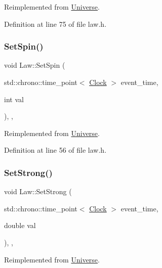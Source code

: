 Reimplemented from \hyperlink{class_universe_ae0cb8d86b2fbb8396d605160344b42f5}{Universe}.



Definition at line 75 of file law.\+h.

\mbox{\label{class_law_a3de75edea5e20db0a7b731de61f07dea}} 
\subsubsection{\texorpdfstring{Set\+Spin()}{SetSpin()}}
{\footnotesize\ttfamily void Law\+::\+Set\+Spin (\begin{DoxyParamCaption}\item[{std\+::chrono\+::time\+\_\+point$<$ \hyperlink{universe_8h_a0ef8d951d1ca5ab3cfaf7ab4c7a6fd80}{Clock} $>$}]{event\+\_\+time,  }\item[{int}]{val }\end{DoxyParamCaption})\hspace{0.3cm}{\ttfamily [inline]}, {\ttfamily [final]}, {\ttfamily [virtual]}}



Reimplemented from \hyperlink{class_universe_ae2ae1c3b3e4cde2c18f5f6a814761ec8}{Universe}.



Definition at line 56 of file law.\+h.

\mbox{\label{class_law_a4cd0dd1908edbd02090dd1ba1387d722}} 
\subsubsection{\texorpdfstring{Set\+Strong()}{SetStrong()}}
{\footnotesize\ttfamily void Law\+::\+Set\+Strong (\begin{DoxyParamCaption}\item[{std\+::chrono\+::time\+\_\+point$<$ \hyperlink{universe_8h_a0ef8d951d1ca5ab3cfaf7ab4c7a6fd80}{Clock} $>$}]{event\+\_\+time,  }\item[{double}]{val }\end{DoxyParamCaption})\hspace{0.3cm}{\ttfamily [inline]}, {\ttfamily [final]}, {\ttfamily [virtual]}}



Reimplemented from \hyperlink{class_universe_a5946c8f3d4cda305f3ecd10df21a2f94}{Universe}.



